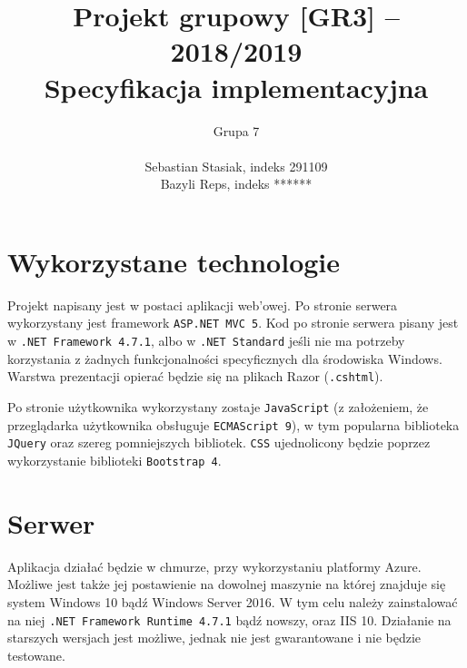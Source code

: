 \documentclass[a4paper, 10pt, titlepage]{article}
\title {Projekt grupowy [GR3] -- 2018/2019\\Specyfikacja implementacyjna}
\author{Grupa 7 \\\\ Sebastian Stasiak, indeks 291109 \\ Bazyli Reps, indeks ******}
\newcommand{\code}[1]{\texttt{#1}}
\begin{document}
\maketitle
\tableofcontents
\newpage

\section{Wykorzystane technologie}

Projekt napisany jest w postaci aplikacji web'owej.
Po stronie serwera wykorzystany jest framework \code{ASP.NET MVC 5}. Kod po stronie serwera pisany jest w \code{.NET Framework 4.7.1}, albo w \code{.NET Standard} jeśli nie ma potrzeby korzystania z żadnych funkcjonalności specyficznych dla środowiska Windows.
Warstwa prezentacji opierać będzie się na plikach Razor (\code{.cshtml}).

Po stronie użytkownika wykorzystany zostaje \code{JavaScript} (z założeniem, że przeglądarka użytkownika obsługuje \code{ECMAScript 9}), w tym popularna biblioteka \code{JQuery} oraz szereg pomniejszych bibliotek.
\code{CSS} ujednolicony będzie poprzez wykorzystanie biblioteki \code{Bootstrap 4}.

\section{Serwer}

Aplikacja działać będzie w chmurze, przy wykorzystaniu platformy Azure.
Możliwe jest także jej postawienie na dowolnej maszynie na której znajduje się system Windows 10 bądź Windows Server 2016.
W tym celu należy zainstalować na niej \code{.NET Framework Runtime 4.7.1} bądź nowszy, oraz IIS 10.
Działanie na starszych wersjach jest możliwe, jednak nie jest gwarantowane i nie będzie testowane.
\end{document}
